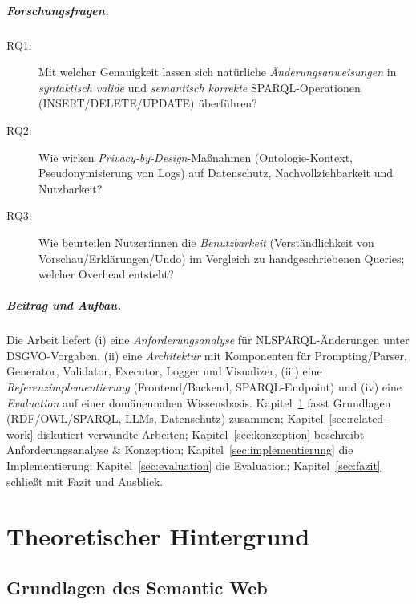 \paragraph{Forschungsfragen.}
\begin{description}
\item[RQ1:] Mit welcher Genauigkeit lassen sich natürliche \emph{Änderungsanweisungen} in \emph{syntaktisch valide} und \emph{semantisch korrekte} SPARQL-Operationen (INSERT/DELETE/UPDATE) überführen?
\item[RQ2:] Wie wirken \emph{Privacy-by-Design}-Maßnahmen (Ontologie-Kontext, Pseudonymisierung von Logs) auf Datenschutz, Nachvollziehbarkeit und Nutzbarkeit?
\item[RQ3:] Wie beurteilen Nutzer:innen die \emph{Benutzbarkeit} (Verständlichkeit von Vorschau/Erklärungen/Undo) im Vergleich zu handgeschriebenen Queries; welcher Overhead entsteht?
\end{description}

\paragraph{Beitrag und Aufbau.}
Die Arbeit liefert (i) eine \emph{Anforderungsanalyse} für NL{\textrightarrow}SPARQL-Änderungen unter DSGVO-Vorgaben, (ii) eine \emph{Architektur} mit Komponenten für Prompting/Parser, Generator, Validator, Executor, Logger und Visualizer, (iii) eine \emph{Referenzimplementierung} (Frontend/Backend, SPARQL-Endpoint) und (iv) eine \emph{Evaluation} auf einer domänennahen Wissensbasis. Kapitel~\ref{sec:theorie} fasst Grundlagen (RDF/OWL/SPARQL, LLMs, Datenschutz) zusammen; Kapitel~\ref{sec:related-work} diskutiert verwandte Arbeiten; Kapitel~\ref{sec:konzeption} beschreibt Anforderungsanalyse \& Konzeption; Kapitel~\ref{sec:implementierung} die Implementierung; Kapitel~\ref{sec:evaluation} die Evaluation; Kapitel~\ref{sec:fazit} schließt mit Fazit und Ausblick.






\chapter{Theoretischer Hintergrund}
\label{sec:theorie}

\section{Grundlagen des Semantic Web}
\label{sec:grundlagen-semantic-web}

